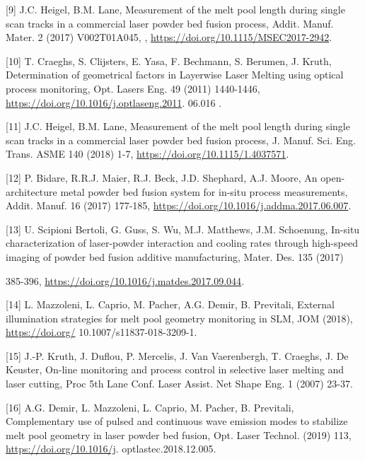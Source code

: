 \documentclass[10pt]{article}
\begin{document}
[9] J.C. Heigel, B.M. Lane, Measurement of the melt pool length during single scan tracks in a commercial laser powder bed fusion process, Addit. Manuf. Mater. 2 (2017) V002T01A045, , \href{https://doi.org/10.1115/MSEC2017-2942}{https://doi.org/10.1115/MSEC2017-2942}.

[10] T. Craeghs, S. Clijsters, E. Yasa, F. Bechmann, S. Berumen, J. Kruth, Determination of geometrical factors in Layerwise Laser Melting using optical process monitoring, Opt. Lasers Eng. 49 (2011) 1440-1446, \href{https://doi.org/10.1016/j.optlaseng.2011}{https://doi.org/10.1016/j.optlaseng.2011}. 06.016 .

[11] J.C. Heigel, B.M. Lane, Measurement of the melt pool length during single scan tracks in a commercial laser powder bed fusion process, J. Manuf. Sci. Eng. Trans. ASME 140 (2018) 1-7, \href{https://doi.org/10.1115/1.4037571}{https://doi.org/10.1115/1.4037571}.

[12] P. Bidare, R.R.J. Maier, R.J. Beck, J.D. Shephard, A.J. Moore, An open-architecture metal powder bed fusion system for in-situ process measurements, Addit. Manuf. 16 (2017) 177-185, \href{https://doi.org/10.1016/j.addma.2017.06.007}{https://doi.org/10.1016/j.addma.2017.06.007}.

[13] U. Scipioni Bertoli, G. Guss, S. Wu, M.J. Matthews, J.M. Schoenung, In-situ characterization of laser-powder interaction and cooling rates through high-speed imaging of powder bed fusion additive manufacturing, Mater. Des. 135 (2017)

385-396, \href{https://doi.org/10.1016/j.matdes.2017.09.044}{https://doi.org/10.1016/j.matdes.2017.09.044}.

[14] L. Mazzoleni, L. Caprio, M. Pacher, A.G. Demir, B. Previtali, External illumination strategies for melt pool geometry monitoring in SLM, JOM (2018), \href{https://doi.org/}{https://doi.org/} 10.1007/s11837-018-3209-1.

[15] J.-P. Kruth, J. Duflou, P. Mercelis, J. Van Vaerenbergh, T. Craeghs, J. De Keuster, On-line monitoring and process control in selective laser melting and laser cutting, Proc 5th Lane Conf. Laser Assist. Net Shape Eng. 1 (2007) 23-37.

[16] A.G. Demir, L. Mazzoleni, L. Caprio, M. Pacher, B. Previtali, Complementary use of pulsed and continuous wave emission modes to stabilize melt pool geometry in laser powder bed fusion, Opt. Laser Technol. (2019) 113, \href{https://doi.org/10.1016/j}{https://doi.org/10.1016/j}. optlastec.2018.12.005.
\end{document}
